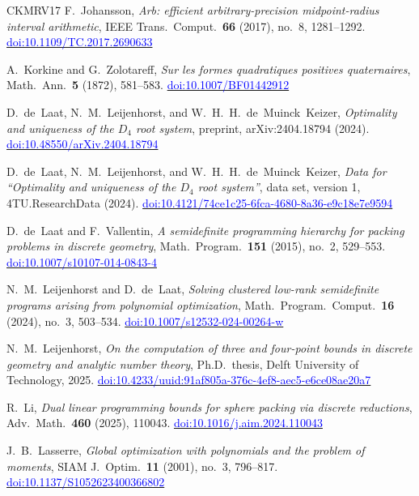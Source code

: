 \documentclass[11pt,reqno]{amsart}
\newcommand{\bluelink}[2]{\href{#1}{\textcolor{blue}{#2}}}
\renewcommand{\_}{\origunderscore\allowbreak}
\numberwithin{equation}{section}
\theoremstyle{plain}
\theoremstyle{definition}
\theoremstyle{remark}
\begin{document}
\begin{thebibliography}{CKMRV17}
F.~Johansson,
\textit{Arb: efficient arbitrary-precision midpoint-radius interval arithmetic},
IEEE Trans.\ Comput.\ \textbf{66} (2017), no.~8, 1281--1292.
\bluelink{https://doi.org/10.1109/TC.2017.2690633}{doi:10.1109/TC.2017.2690633}

A.~Korkine and G.~Zolotareff,
\textit{Sur les formes quadratiques positives quaternaires},
Math.\ Ann.\ \textbf{5} (1872), 581--583.
\bluelink{https://doi.org/10.1007/BF01442912}{doi:10.1007/BF01442912}

D.~de~Laat, N.~M.~Leijenhorst, and W.~H.~H.~de~Muinck~Keizer,
\textit{Optimality and uniqueness of the $D_4$ root system},
preprint, arXiv:2404.18794 (2024).
\bluelink{https://doi.org/10.48550/arXiv.2404.18794}{doi:10.48550/arXiv.2404.18794}

D.~de~Laat, N.~M.~Leijenhorst, and W.~H.~H.~de~Muinck~Keizer,
\textit{Data for ``Optimality and uniqueness of the $D_4$ root system''},
data set, version 1, 4TU.ResearchData (2024).
\bluelink{https://doi.org/10.4121/74ce1c25-6fca-4680-8a36-e9c18e7e9594}{doi:10.4121/74ce1c25-6fca-4680-8a36-e9c18e7e9594}

D.~de~Laat and F.~Vallentin,
\textit{A semidefinite programming hierarchy for packing problems in
discrete geometry},
Math.\ Program.\ \textbf{151} (2015), no.~2, 529--553.
\bluelink{https://doi.org/10.1007/s10107-014-0843-4}{doi:10.1007/s10107-014-0843-4}

N.~M.~Leijenhorst and D.~de~Laat,
\textit{Solving clustered low-rank semidefinite programs arising from
polynomial optimization},
Math.\ Program.\ Comput.\ \textbf{16} (2024), no.~3, 503--534.
\bluelink{https://doi.org/10.1007/s12532-024-00264-w}{doi:10.1007/s12532-024-00264-w}

N.~M.~Leijenhorst,
\textit{On the computation of three and four-point bounds in discrete
geometry and analytic number theory},
Ph.D.\ thesis, Delft University of Technology, 2025.
\bluelink{https://doi.org/10.4233/uuid:91af805a-376c-4ef8-aec5-e6ce08ae20a7}{doi:10.4233/uuid:91af805a-376c-4ef8-aec5-e6ce08ae20a7}

R.~Li,
\textit{Dual linear programming bounds for sphere packing via discrete
reductions},
Adv.\ Math.\ \textbf{460} (2025), 110043.
\bluelink{https://doi.org/10.1016/j.aim.2024.110043}{doi:10.1016/j.aim.2024.110043}

J.~B.~Lasserre,
\textit{Global optimization with polynomials and the problem of moments},
SIAM J.\ Optim.\ \textbf{11} (2001), no.~3, 796--817.
\bluelink{https://doi.org/10.1137/S1052623400366802}{doi:10.1137/S1052623400366802}


\end{thebibliography}
\end{document}
